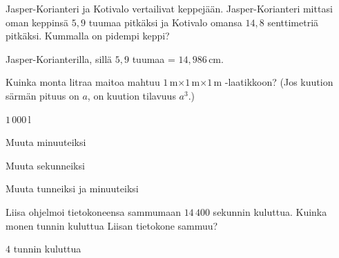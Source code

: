 \begin{tehtavasivu}
\begin{tehtava}
Jasper-Korianteri ja Kotivalo vertailivat keppejään. Jasper-Korianteri mittasi oman keppinsä $5,9$ tuumaa pitkäksi ja Kotivalo omansa $14,8$ senttimetriä pitkäksi. Kummalla on pidempi keppi?
\begin{vastaus}
Jasper-Korianterilla, sillä $5,9$ tuumaa = $14,986$\,cm.
\end{vastaus}
\end{tehtava}

\begin{tehtava}
Kuinka monta litraa maitoa mahtuu $1$\,m$\times 1$\,m$\times 1$\,m -laatikkoon? (Jos kuution särmän pituus on $a$, on kuution tilavuus $a^3$.)
	\begin{vastaus}
	$1\,000$\,l
	\end{vastaus}
\end{tehtava}

\begin{tehtava}
Muuta minuuteiksi
\begin{vastaus}
\end{vastaus}
\end{tehtava}
\begin{tehtava}
Muuta sekunneiksi
\begin{vastaus}
\end{vastaus}
\end{tehtava}

\begin{tehtava}
Muuta tunneiksi ja minuuteiksi
\begin{vastaus}
\end{vastaus}
\end{tehtava}

\begin{tehtava}
Liisa ohjelmoi tietokoneensa sammumaan $14\,400$ sekunnin kuluttua. Kuinka monen tunnin kuluttua Liisan tietokone sammuu?
\begin{vastaus}
$4$ tunnin kuluttua
\end{vastaus}
\end{tehtava}


\end{tehtavasivu}
